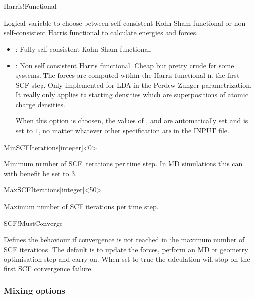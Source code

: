 \begin{fdflogicalF}{Harris!Functional}
  
  Logical variable to choose between self-consistent Kohn-Sham
  functional or non self-consistent Harris functional to calculate
  energies and forces.
  \begin{itemize}
    \item \fdffalse: Fully self-consistent Kohn-Sham functional.
    \item \fdftrue: Non self consistent Harris functional. Cheap but
    pretty crude for some systems. The forces are computed within the
    Harris functional in the first SCF step. Only implemented for LDA in
    the Perdew-Zunger parametrization. It really only applies to starting
    densities which are superpositions of atomic charge densities.

    When this option is choosen, the values of ,
     and  are automatically
    set \fdffalse and  is set to $1$, no matter
    whatever other specification are in the INPUT file.
  \end{itemize}

\end{fdflogicalF}

\begin{fdfentry}{MinSCFIterations}[integer]<0>

  Minimum number of SCF iterations per time step. In MD
  simulations this can with benefit be set to 3.
  
\end{fdfentry}

\begin{fdfentry}{MaxSCFIterations}[integer]<50>

  Maximum number of SCF iterations per time step. 
  
\end{fdfentry}

\begin{fdflogicalF}{SCF!MustConverge}

  Defines the behaviour if convergence is not reached in the maximum
  number of SCF iterations. The default is to update the forces, perform
  an MD or geometry optimisation step and carry on. When set to true
  the calculation will stop on the first SCF convergence failure.
  
\end{fdflogicalF}


\subsubsection{Mixing options}

